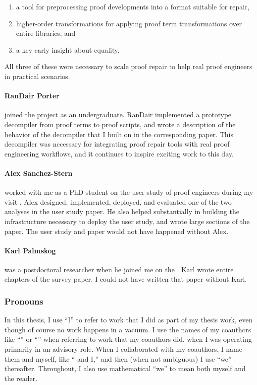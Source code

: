 \begin{enumerate}
\item a tool for preprocessing proof developments into a format suitable for repair,
\item higher-order transformations for applying proof term transformations over entire libraries, and
\item a key early insight about equality.
\end{enumerate}
All three of these were necessary to scale proof repair to help real proof engineers in practical scenarios.

\paragraph{RanDair Porter}
 joined the project as an undergraduate.
RanDair implemented a prototype decompiler from proof terms to proof scripts,
and wrote a description of the behavior of the decompiler that I built on in the corresponding paper.
This decompiler was necessary for integrating proof repair tools with real proof engineering workflows,
and it continues to inspire exciting work to this day.

\paragraph{Alex Sanchez-Stern}
 worked with me as a PhD student on the  user study of proof engineers during my visit .
Alex designed, implemented, deployed, and evaluated one of the two analyses in the user study paper.
He also helped substantially in building the infrastructure necessary to deploy the user study,
and wrote large sections of the paper.
The user study and paper would not have happened without Alex.

\paragraph{Karl Palmskog}
 was a postdoctoral researcher when he joined me on the .
Karl wrote entire chapters of the survey paper.
I could not have written that paper without Karl.

\subsubsection*{Pronouns}

In this thesis, I use ``I'' to refer to work that I did as part of my thesis work,
even though of course no work happens in a vacuum.
I use the names of my coauthors like ``'' or ``'' when referring to work that my coauthors did,
when I was operating primarily in an advisory role.
When I collaborated with my coauthors, I name them and myself, like `` and I,''
and then (when not ambiguous) I use ``we'' thereafter.
Throughout, I also use mathematical ``we'' to mean both myself and the reader.

